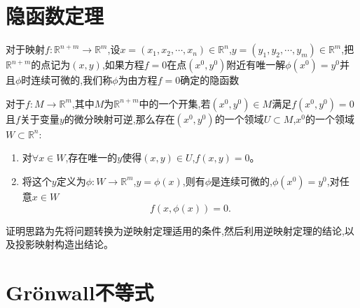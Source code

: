 \section{隐函数定理}
\begin{defn}[隐函数]
    对于映射$f:\mathbb{R}^{n+m}\to\mathbb{R}^m$,设$x=(x_1,x_2,\cdots,x_n)\in\mathbb{R}^n$,$y=(y_1,y_2,\cdots,y_m)\in\mathbb{R}^m$,把$\mathbb{R}^{n+m}$的点记为$(x,y)$,如果方程$f=0$在点$(x^0,y^0)$附近有唯一解$\phi(x^0)=y^0$并且$\phi$时连续可微的,我们称$\phi$为由方程$f=0$确定的隐函数
\end{defn}
\begin{thm}
    对于$f:M\to \mathbb{R}^m$,其中$M$为$\mathbb{R}^{n+m}$中的一个开集,若$(x^0,y^0)\in M$满足$f(x^0,y^0)=0$且$f$关于变量$y$的微分映射可逆,那么存在$(x^0,y^0)$的一个领域$U\subset M$,$x^0$的一个领域$W\subset\mathbb{R}^n$:
    \begin{enumerate}
        \item 对$\forall x\in W$,存在唯一的$y$使得$(x,y)\in U$,$f(x,y)=0$。
        \item 将这个$y$定义为$\phi:W\to\mathbb{R}^m$,$y=\phi(x)$,则有$\phi$是连续可微的,$\phi(x^0)=y^0$,对任意$x\in W$
        \begin{equation}
            f(x,\phi(x))=0.
        \end{equation}
    \end{enumerate}
\end{thm}
\begin{pf}
    证明思路为先将问题转换为逆映射定理适用的条件,然后利用逆映射定理的结论,以及投影映射构造出结论。
\end{pf}
\section{Grönwall不等式}

